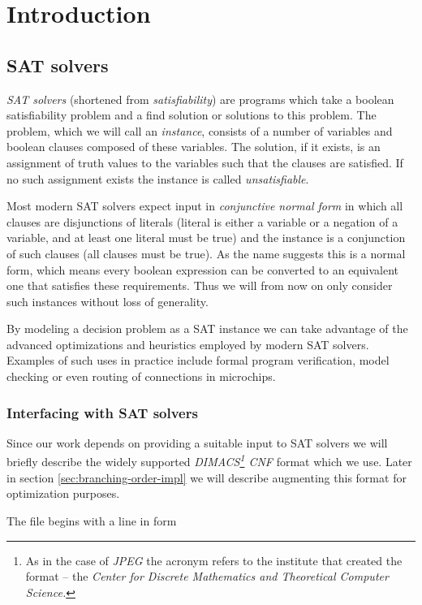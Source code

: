 \chapter{Introduction}
\section{SAT solvers}
\emph{SAT solvers} (shortened from \emph{satisfiability}) are programs which take a boolean satisfiability problem and a find solution or solutions to this problem.
The problem, which we will call an \emph{instance}, consists of a number of variables and boolean clauses composed of these variables.
The solution, if it exists, is an assignment of truth values to the variables such that the clauses are satisfied.
If no such assignment exists the instance is called \emph{unsatisfiable}.

Most modern SAT solvers expect input in \emph{conjunctive normal form} in which all clauses are disjunctions of literals (literal is either a variable or a negation of a variable, and at least one literal must be true) and the instance is a conjunction of such clauses (all clauses must be true).
As the name suggests this is a normal form, which means every boolean expression can be converted to an equivalent one that satisfies these requirements.
Thus we will from now on only consider such instances without loss of generality.

By modeling a decision problem as a SAT instance we can take advantage of the advanced optimizations and heuristics employed by modern SAT solvers.
Examples of such uses in practice include formal program verification, model checking or even routing of connections in microchips.

\subsection{Interfacing with SAT solvers}
\label{sec:dimacs}
Since our work depends on providing a suitable input to SAT solvers we will briefly describe the widely supported \emph{DIMACS\footnote{As in the case of \emph{JPEG} the acronym refers to the institute that created the format -- the \emph{Center for Discrete Mathematics and Theoretical Computer Science.}} CNF} format which we use.
Later in section \ref{sec:branching-order-impl} we will describe augmenting this format for optimization purposes.

The file begins with a line in form

